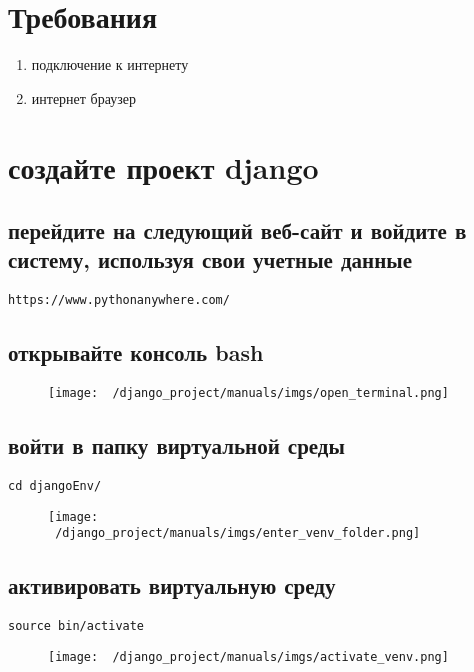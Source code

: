 \documentclass[12pt]{article}
\begin{document}
\tableofcontents
\newpage
\setcounter{page}{1}%
\section{Требования}
\begin{enumerate}
	\item подключение к интернету
  \item интернет браузер
\end{enumerate}
\section{создайте проект django}
    \subsection{ перейдите на следующий веб-сайт и войдите в систему, используя свои учетные данные}
      \begin{lstlisting}[caption=\phantom{},style=conlst,label={lst:enter_desktop}]
      https://www.pythonanywhere.com/
			\end{lstlisting}
    \subsection{открывайте консоль bash}
	\begin{figure}[H]
		\centering
		\texttt{[image: ~/django\_project/manuals/imgs/open\_terminal.png]}
		\caption{}
	\end{figure}

    \subsection{ войти в папку виртуальной среды}
			\begin{lstlisting}[caption=\phantom{},style=conlst,label={lst:enter_desktop}]
      cd djangoEnv/
			\end{lstlisting}
	\begin{figure}[H]
		\centering
		\texttt{[image: ~/django\_project/manuals/imgs/enter\_venv\_folder.png]}
		\caption{}
	\end{figure}

    \subsection{активировать виртуальную среду}
			\begin{lstlisting}[caption=\phantom{},style=conlst,label={lst:enter_desktop}]
      source bin/activate
			\end{lstlisting}
	\begin{figure}[H]
		\centering
		\texttt{[image: ~/django\_project/manuals/imgs/activate\_venv.png]}
		\caption{}
	\end{figure}
\end{document}
